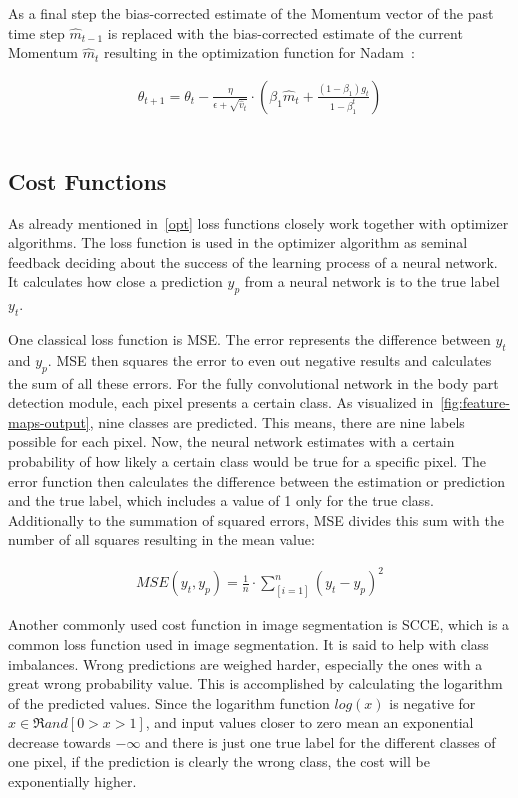 As a final step the bias-corrected estimate of the Momentum vector of the past time step $\hat{m}_{t-1}$ is replaced
with the bias-corrected estimate of the current Momentum $\hat{m}_{t}$ resulting in the optimization function for \gls{Nadam}~\cite{optimizersoverview}:



\begin{align}
    \theta_{t+1} = \theta_{t} - \frac{\eta}{\epsilon+\sqrt{\hat{v}_t}} \cdot (\beta_1\hat{m}_t+\frac{(1-\beta_1)g_t}{1-\beta_1^t}) \label{eqn:nadam:8}
\end{align}
\\ \par

\subsection{Cost Functions}
\label{cost}
As already mentioned in~\autoref{opt} loss functions closely work together with optimizer algorithms.
The loss function is used in the optimizer algorithm as seminal feedback deciding about the success of the learning process of a
neural network.
It calculates how close a prediction $y_p$ from a neural network is to the true label $y_t$.

One classical loss function is \gls{MSE}.
The error represents the difference between $y_t$ and $y_p$.
\gls{MSE} then squares the error to even out negative results and calculates the sum of all these errors.
For the fully convolutional network in the body part detection module, each pixel presents a certain class.
As visualized in~\ref{fig:feature-maps-output}, nine classes are predicted.
This means, there are nine labels possible for each pixel.
Now, the neural network estimates with a certain probability of how likely a certain class would be true for a specific pixel.
The error function then calculates the difference between the estimation or prediction and the true label, which includes a
value of 1 only for the true class.
Additionally to the summation of squared errors, \gls{MSE} divides this sum with the number of all squares resulting in the mean
value:

\begin{align}
    MSE(y_t,y_p) = \frac{1}{n}\cdot\sum_[i=1]^n(y_t-y_p)^2
\end{align}

Another commonly used cost function in image segmentation is \gls{SCCE}, which is a common loss function used in image
segmentation.
It is said to help with class imbalances.
Wrong predictions are weighed harder, especially the ones with a great wrong probability value.
This is accomplished by calculating the logarithm of the predicted values.
Since the logarithm function $log(x)$ is negative for $x \in \Re and [0>x>1]$, and input values closer to zero mean
an exponential decrease towards $-\infty$ and there is just one true label for the different classes of one pixel, if
the prediction is clearly the wrong class, the cost will be exponentially higher.

